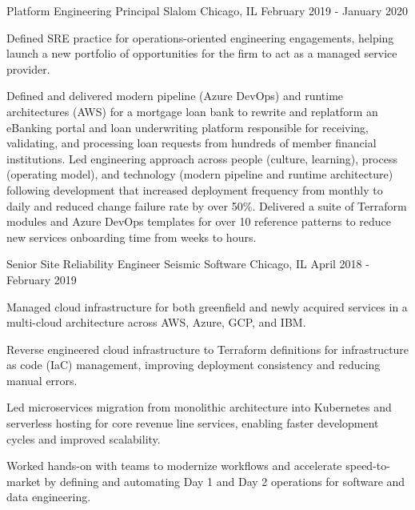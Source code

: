 \begin{cventries}
  \cventry
    {Platform Engineering Principal} %
    {Slalom} %
    {Chicago, IL} %
    {February 2019 - January 2020} %
    {
      \begin{cvitems} %
        \item {Defined SRE practice for operations-oriented engineering engagements, helping launch a new portfolio of opportunities for the firm to act as a managed service provider.}
        \item {Defined and delivered modern pipeline (Azure DevOps) and runtime architectures (AWS) for a mortgage loan bank to rewrite and replatform an eBanking portal and loan underwriting platform responsible for receiving, validating, and processing loan requests from hundreds of member financial institutions. Led engineering approach across people (culture, learning), process (operating model), and technology (modern pipeline and runtime architecture) following development that increased deployment frequency from monthly to daily and reduced change failure rate by over 50\%. Delivered a suite of Terraform modules and Azure DevOps templates for over 10 reference patterns to reduce new services onboarding time from weeks to hours.}
      \end{cvitems}
    }

  \cventry
    {Senior Site Reliability Engineer} %
    {Seismic Software} %
    {Chicago, IL} %
    {April 2018 - February 2019} %
    {
      \begin{cvitems} %
        \item {Managed cloud infrastructure for both greenfield and newly acquired services in a multi-cloud architecture across AWS, Azure, GCP, and IBM.}
        \item {Reverse engineered cloud infrastructure to Terraform definitions for infrastructure as code (IaC) management, improving deployment consistency and reducing manual errors.}
        \item {Led microservices migration from monolithic architecture into Kubernetes and serverless hosting for core revenue line services, enabling faster development cycles and improved scalability.}
        \item {Worked hands-on with teams to modernize workflows and accelerate speed-to-market by defining and automating Day 1 and Day 2 operations for software and data engineering.}
      \end{cvitems}
    }


\end{cventries}
